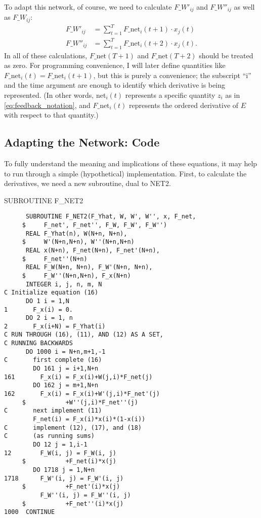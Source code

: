 \documentclass[journal]{IEEEtran} %
\begin{document}
To adapt this network, of course, we need to calculate $F\_W'_{ij}$ and $F\_W''_{ij}$ as well as $F\_W_{ij}$:
\begin{align}
    F\_W'_{ij} &= \sum_{t=1}^T F\_\text{net}_i(t+1) \cdot x_j(t) \label{eq:f_wprime_ij} \\
    F\_W''_{ij} &= \sum_{t=1}^T F\_\text{net}_i(t+2) \cdot x_j(t). \label{eq:f_wprimeprime_ij}
\end{align}
In all of these calculations, $F\_\text{net}(T+1)$ and $F\_\text{net}(T+2)$ should be treated as zero. For programming convenience, I will later define quantities like $F\_\text{net}_i(t) = F\_\text{net}_i(t+1)$, but this is purely a convenience; the subscript ``i'' and the time argument are enough to identify which derivative is being represented. (In other words, net$_i(t)$ represents a specific quantity $z_i$ as in \eqref{eq:feedback_notation}, and $F\_\text{net}_i(t)$ represents the ordered derivative of $E$ with respect to that quantity.)

\subsection{Adapting the Network: Code}
To fully understand the meaning and implications of these equations, it may help to run through a simple (hypothetical) implementation.
First, to calculate the derivatives, we need a new subroutine, dual to NET2.

\begin{fortrancode}
\caption{SUBROUTINE F\_NET2}
\begin{verbatim}
      SUBROUTINE F_NET2(F_Yhat, W, W', W'', x, F_net,
     $     F_net', F_net'', F_W, F_W', F_W'')
      REAL F_Yhat(n), W(N+n, N+n),
     $     W'(N+n,N+n), W''(N+n,N+n)
      REAL x(N+n), F_net(N+n), F_net'(N+n),
     $     F_net''(N+n)
      REAL F_W(N+n, N+n), F_W'(N+n, N+n),
     $     F_W''(N+n,N+n), F_x(N+n)
      INTEGER i, j, n, m, N
C Initialize equation (16)
      DO 1 i = 1,N
1       F_x(i) = 0.
      DO 2 i = 1, n
2       F_x(i+N) = F_Yhat(i)
C RUN THROUGH (16), (11), AND (12) AS A SET,
C RUNNING BACKWARDS
      DO 1000 i = N+n,m+1,-1
C       first complete (16)
        DO 161 j = i+1,N+n
161       F_x(i) = F_x(i)+W(j,i)*F_net(j)
        DO 162 j = m+1,N+n
162       F_x(i) = F_x(i)+W'(j,i)*F_net'(j)
     $           +W''(j,i)*F_net''(j)
C       next implement (11)
        F_net(i) = F_x(i)*x(i)*(1-x(i))
C       implement (12), (17), and (18)
C       (as running sums)
        DO 12 j = 1,i-1
12        F_W(i, j) = F_W(i, j)
     $           +F_net(i)*x(j)
        DO 1718 j = 1,N+n
1718      F_W'(i, j) = F_W'(i, j)
     $           +F_net'(i)*x(j)
          F_W''(i, j) = F_W''(i, j)
     $           +F_net''(i)*x(j)
1000  CONTINUE
\end{verbatim}
\end{fortrancode}
\end{document}
